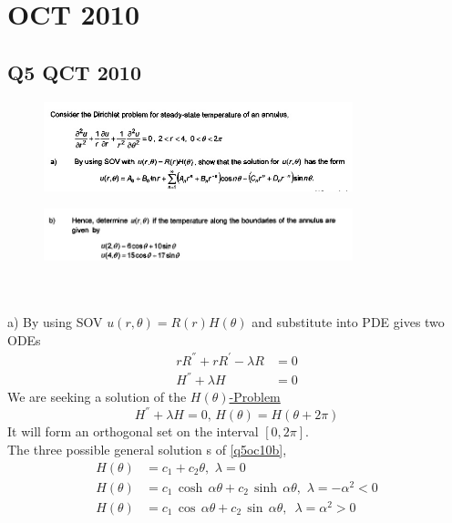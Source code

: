 \chapter{OCT 2010}
\section{Q5 QCT 2010}
\begin{figure}[!ht]
\centering
 \includegraphics[width=0.8\textwidth]{q8oct10.jpg}    %
\end{figure}
\begin{figure}[!ht]
\centering
 \includegraphics[width=0.8\textwidth]{q8oct10a.jpg}    %
\end{figure}\\
\\
a)
By using SOV $u(r,\theta)=R(r)H(\theta)$ and substitute into PDE gives two ODEs
\begin{align}
rR^{''}+rR^{'}-\lambda R&=0\label{q5oc10a}\\
H^{''}+\lambda H&=0\label{q5oc10b}
\end{align}
 We are seeking a solution of the \underline{$H(\theta)$-Problem }
 \begin{equation}
H^{''}+\lambda H=0,\,H(\theta)=H(\theta+2\pi)\label{q5oc11c}
\end{equation}
It will form an orthogonal set on the interval $[0,2\pi]$.\\
The three possible general solution s of \eqref{q5oc10b},
\begin{align}
H(\theta)&=c_1+c_2\theta,\,\,\lambda=0\label{q5oc11e}\\
H(\theta)&=c_1\,\cosh\,\alpha\theta+c_2\,\sinh\,\alpha\theta,\,\,\lambda=-\alpha^2<0\label{q5oc11f}\\
H(\theta)&=c_1\,\cos\,\alpha\theta+c_2\,\sin\,\alpha\theta,\,\,\,\lambda=\alpha^2>0\label{q5oc11g}
\end{align}
